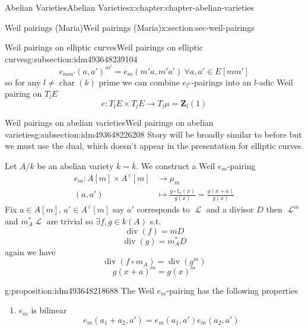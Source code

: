 \documentclass[oneside,10pt,]{book}
\numberwithin{equation}{section}
\newcommand{\sheaf}[1]{\operatorname{\mathcal{#1}}}
\newcommand{\lb}{[}
\newcommand{\rb}{]}
\newcommand{\ZZ}{\mathbf{Z}}
\DeclareMathOperator{\divisor}{div}
\DeclareMathOperator{\characteristic}{char}
\newcommand{\amp}{&}
\begin{document}
\begin{chapterptx}{Abelian Varieties}{}{Abelian Varieties}{}{}{x:chapter:chapter-abelian-varieties}
\begin{sectionptx}{Weil pairings (Maria)}{}{Weil pairings (Maria)}{}{}{x:section:sec-weil-pairings}
\begin{subsectionptx}{Weil pairings on elliptic curves}{}{Weil pairings on elliptic curves}{}{}{g:subsection:idm493648239104}
\begin{equation*}
e_{mm'} (a,a')^{m'} = e_m(m'a, m'a') \ \forall a,a' \in E[mm']
\end{equation*}
so for any \(l\ne \characteristic(k)\) prime we can combine \(e_{l^n}\)-pairings into an \(l\)-adic Weil pairing on \(T_l E\)%
\begin{equation*}
e \colon T_l E\times T_lE \to T_l \mu = \ZZ_l(1)
\end{equation*}
%
\end{subsectionptx}
%
%
\typeout{************************************************}
\typeout{************************************************}
%
\begin{subsectionptx}{Weil pairings on abelian varieties}{}{Weil pairings on abelian varieties}{}{}{g:subsection:idm493648226208}
Story will be broadly similar to before but we must use the dual, which doesn't appear in the presentation for elliptic curves.%
\par
Let \(A/k\) be an abelian variety \(k = \overline k\). We construct a Weil \(e_m\)-pairing%
\begin{align*}
e_m \colon A[m]\times A^\vee [m] \amp\to \mu_m\\
(a,a') \amp\mapsto \frac{g\circ t_a(x)}{g(x)} = \frac{g(x+a)}{g(x)}
\end{align*}
Fix \(a\in A\lb m\rb,\,a'\in A^\vee\lb m\rb\) say \(a'\) corresponds to \(\sheaf L\) and a divisor \(D\) then \(\sheaf L^m \) and \(m_A^* \sheaf L\) are trivial so \(\exists f,g \in k(A)\) s.t.%
\begin{equation*}
\divisor (f) = m D
\end{equation*}
%
\begin{equation*}
\divisor (g) = m_A^* D
\end{equation*}
again we have%
\begin{equation*}
\divisor( f\circ m_A) = \divisor (g^m)
\end{equation*}
%
\begin{equation*}
g(x+a)^m = g(x)^m
\end{equation*}
%
\begin{proposition}{}{}{g:proposition:idm493648218688}%
The Weil \(e_m\)-pairing has the following properties%
\begin{enumerate}
\item{}\(e_m\) is bilinear%
\begin{equation*}
e_m(a_1+a_2,a') = e_m(a_1,a')e_m(a_2, a')
\end{equation*}

\end{enumerate}
\end{proposition}
\end{subsectionptx}
\end{sectionptx}
\end{chapterptx}
\end{document}

